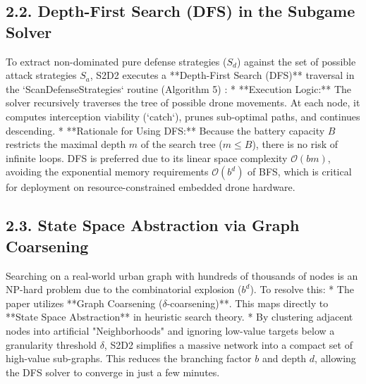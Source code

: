 \documentclass[../main.tex]{subfiles}
\begin{document}
\subsection{2.2. Depth-First Search (DFS) in the Subgame Solver}
To extract non-dominated pure defense strategies ($S_d$) against the set of possible attack strategies $S_a$, S2D2 executes a **Depth-First Search (DFS)** traversal in the `ScanDefenseStrategies` routine (Algorithm 5) \cite{mutzari2025defending}:
*   **Execution Logic:** The solver recursively traverses the tree of possible drone movements. At each node, it computes interception viability (`catch`), prunes sub-optimal paths, and continues descending.
*   **Rationale for Using DFS:** Because the battery capacity $B$ restricts the maximal depth $m$ of the search tree ($m \le B$), there is no risk of infinite loops. DFS is preferred due to its linear space complexity $\mathcal{O}(bm)$, avoiding the exponential memory requirements $\mathcal{O}(b^d)$ of BFS, which is critical for deployment on resource-constrained embedded drone hardware.

\subsection{2.3. State Space Abstraction via Graph Coarsening}
Searching on a real-world urban graph with hundreds of thousands of nodes is an NP-hard problem due to the combinatorial explosion ($b^d$). To resolve this:
*   The paper utilizes **Graph Coarsening ($\delta$-coarsening)**. This maps directly to **State Space Abstraction** in heuristic search theory.
*   By clustering adjacent nodes into artificial "Neighborhoods" and ignoring low-value targets below a granularity threshold $\delta$, S2D2 simplifies a massive network into a compact set of high-value sub-graphs. This reduces the branching factor $b$ and depth $d$, allowing the DFS solver to converge in just a few minutes.
\end{document}
